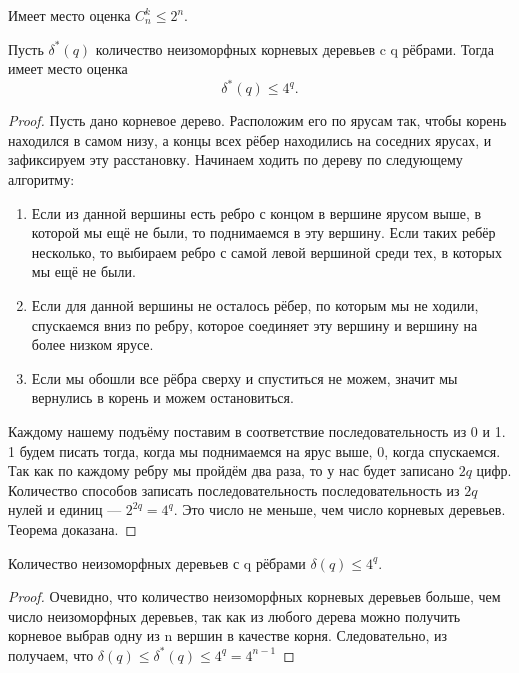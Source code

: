 \begin{proposition}
	Имеет место оценка $C_n^k \le 2^n$.
\end{proposition}
\begin{theorem}
	Пусть $\delta^*(q)$ количество неизоморфных корневых деревьев c q рёбрами. Тогда имеет место оценка \[
		\delta^*\left( q \right) \le 4^q
.\] 
\end{theorem}
\begin{proof}
Пусть дано корневое дерево. Расположим его по ярусам так, чтобы корень находился
в самом низу, а концы всех рёбер находились на соседних ярусах, и зафиксируем
эту расстановку. Начинаем ходить по дереву по следующему алгоритму:
\begin{enumerate}
	\item Если из данной вершины есть ребро с концом в вершине ярусом выше,
		в которой мы ещё не были,
		то поднимаемся в эту вершину. Если таких ребёр несколько, то
		выбираем ребро с самой левой вершиной среди тех, в которых мы
		ещё не были.
	\item Если для данной вершины не осталось рёбер, по которым мы не
		ходили, спускаемся вниз по ребру, которое соединяет эту вершину
		и вершину на более низком ярусе.
	\item Если мы обошли все рёбра сверху и спуститься не можем, значит мы
		вернулись в корень и можем остановиться.		
\end{enumerate}
Каждому нашему подъёму поставим в соответствие последовательность из 0 и 1. 1
будем писать тогда, когда мы поднимаемся на ярус выше, 0, когда спускаемся.
Так как по каждому ребру мы пройдём два раза, то у нас будет записано $2q$ цифр.
Количество способов записать последовательность последовательность из $2q$ нулей
и единиц --- $2^{2q} = 4^q$. Это число не меньше, чем число корневых деревьев.
Теорема доказана.
\end{proof}
\begin{theorem}
	Количество неизоморфных деревьев с q рёбрами $\delta(q)\le 4^q$.
\end{theorem}
\begin{proof}
Очевидно, что количество неизоморфных корневых деревьев больше, чем число
неизоморфных деревьев, так как из любого дерева можно получить корневое выбрав
одну из n вершин в качестве корня. Следовательно, из 
получаем, что $\delta(q)\le\delta^*(q)\le 4^q = 4^{n-1}$
\end{proof}
